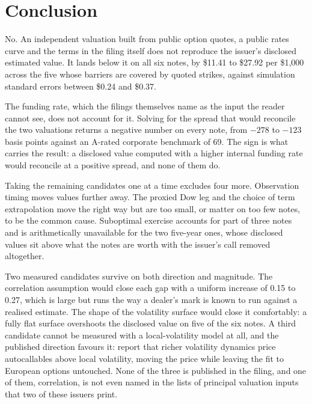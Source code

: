 \section{Conclusion}\label{sec:conclusion}

No. An independent valuation built from public option quotes, a public rates
curve and the terms in the filing itself does not reproduce the issuer's
disclosed estimated value. It lands below it on all six notes, by \$11.41 to
\$27.92 per \$1{,}000 across the five whose barriers are covered by quoted
strikes, against simulation standard errors between \$0.24 and \$0.37.

The funding rate, which the filings themselves name as the input the reader
cannot see, does not account for it. Solving for the spread that would
reconcile the two valuations returns a negative number on every note, from
$-278$ to $-123$ basis points against an A-rated corporate benchmark of 69. The
sign is what carries the result: a disclosed value computed with a higher
internal funding rate would reconcile at a positive spread, and none of them
do.

Taking the remaining candidates one at a time excludes four more. Observation
timing moves values further away. The proxied Dow leg and the choice of term
extrapolation move the right way but are too small, or matter on too few notes,
to be the common cause. Suboptimal exercise accounts for part of three notes
and is arithmetically unavailable for the two five-year ones, whose disclosed
values sit above what the notes are worth with the issuer's call removed
altogether.

Two measured candidates survive on both direction and magnitude. The
correlation assumption would close each gap with a uniform increase of 0.15 to
0.27, which is large but runs the way a dealer's mark is known to run against a
realised estimate. The shape of the volatility surface would close it
comfortably: a fully flat surface overshoots the disclosed value on five of the
six notes. A third candidate cannot be measured with a local-volatility model
at all, and the published direction favours it: \citet{Farkas2022} report that
richer volatility dynamics price autocallables above local volatility, moving
the price while leaving the fit to European options untouched. None of the
three is published in the filing, and one of them, correlation, is not even
named in the lists of principal valuation inputs that two of these issuers
print.

